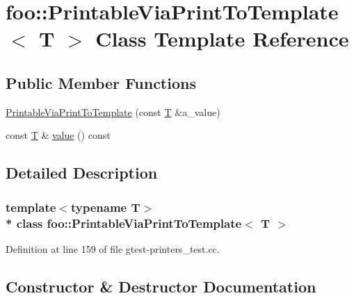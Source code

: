 \hypertarget{classfoo_1_1_printable_via_print_to_template}{}\section{foo\+:\+:Printable\+Via\+Print\+To\+Template$<$ T $>$ Class Template Reference}
\label{classfoo_1_1_printable_via_print_to_template}
\subsection*{Public Member Functions}
\begin{DoxyCompactItemize}
\item 
\hyperlink{classfoo_1_1_printable_via_print_to_template_a8fef9e8b59c9415624230b73469b517e}{Printable\+Via\+Print\+To\+Template} (const \hyperlink{functions__7_8js_adf1f3edb9115acb0a1e04209b7a9937b}{T} \&a\+\_\+value)
\item 
const \hyperlink{functions__7_8js_adf1f3edb9115acb0a1e04209b7a9937b}{T} \& \hyperlink{classfoo_1_1_printable_via_print_to_template_ab8ffa6e2171a76ff21322844bdcf1294}{value} () const 
\end{DoxyCompactItemize}


\subsection{Detailed Description}
\subsubsection*{template$<$typename T$>$\\*
class foo\+::\+Printable\+Via\+Print\+To\+Template$<$ T $>$}



Definition at line 159 of file gtest-\/printers\+\_\+test.\+cc.



\subsection{Constructor \& Destructor Documentation}
